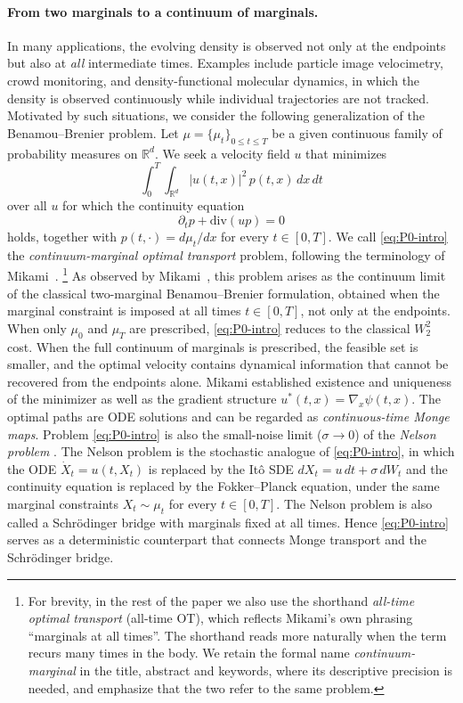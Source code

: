 \documentclass[11pt,leqno]{article}
\theoremstyle{plain}
\theoremstyle{remark}
\theoremstyle{definition}
\numberwithin{equation}{section}
\numberwithin{figure}{section}
\numberwithin{table}{section}
\begin{document}
\paragraph{From two marginals to a continuum of marginals.}
In many applications, the evolving density is observed not only at the
endpoints but also at \emph{all} intermediate times.
Examples include particle image velocimetry, crowd monitoring, and
density-functional molecular dynamics, in which the density is
observed continuously while individual trajectories are not tracked.
Motivated by such situations, we consider the following generalization
of the Benamou--Brenier problem.
Let $\mu=\{\mu_t\}_{0\le t\le T}$ be a given continuous family of
probability measures on $\mathbb{R}^d$.
We seek a velocity field $u$ that minimizes
\begin{equation}\label{eq:P0-intro}
 \int_0^T\!\int_{\mathbb{R}^d}|u(t,x)|^2\,p(t,x)\,dx\,dt
\end{equation}
over all $u$ for which the continuity equation
\[
 \partial_t p+\mathrm{div}(up)=0
\]
holds, together with $p(t,\cdot)=d\mu_t/dx$ for every $t\in[0,T]$.
We call \eqref{eq:P0-intro} the \emph{continuum-marginal optimal
transport} problem, following the terminology of
Mikami~\cite{Mikami2021}.%
\footnote{For brevity, in the rest of the paper we also use the
shorthand \emph{all-time optimal transport} (all-time OT), which
reflects Mikami's own phrasing ``marginals at all times''. The
shorthand reads more naturally when the term recurs many times in
the body. 
We retain the formal name \emph{continuum-marginal} in the title,
abstract and keywords, where its descriptive precision is needed,
and emphasize that the two refer to the same problem.}
As observed by Mikami~\cite{Mikami2021}, this problem arises as the
continuum limit of the classical two-marginal Benamou--Brenier
formulation, obtained when the marginal constraint is imposed at all
times $t\in[0,T]$, not only at the endpoints.
When only $\mu_0$ and $\mu_T$ are prescribed, \eqref{eq:P0-intro}
reduces to the classical $W_2^2$ cost.
When the full continuum of marginals is prescribed, the feasible set
is smaller, and the optimal velocity contains dynamical information
that cannot be recovered from the endpoints alone.
Mikami \cite{Mikami2021} established existence and uniqueness of the
minimizer as well as the gradient structure
$u^*(t,x)=\nabla_x\psi(t,x)$.
The optimal paths are ODE solutions and can be regarded as
\emph{continuous-time Monge maps}.
Problem \eqref{eq:P0-intro} is also the small-noise limit
($\sigma\to 0$) of the \emph{Nelson problem}
\cite{Nelson1985,Mikami1990,Mikami2021}.
The Nelson problem is the stochastic analogue of \eqref{eq:P0-intro},
in which the ODE $\dot X_t=u(t,X_t)$ is replaced by the It\^o SDE
$dX_t=u\,dt+\sigma\,dW_t$ and the continuity equation is replaced by
the Fokker--Planck equation, under the same marginal constraints
$X_t\sim\mu_t$ for every $t\in[0,T]$.
The Nelson problem is also called a Schr\"odinger
bridge with marginals fixed at all times. 
Hence \eqref{eq:P0-intro} serves as a deterministic counterpart that
connects Monge transport and the Schr\"odinger bridge.
\end{document}
